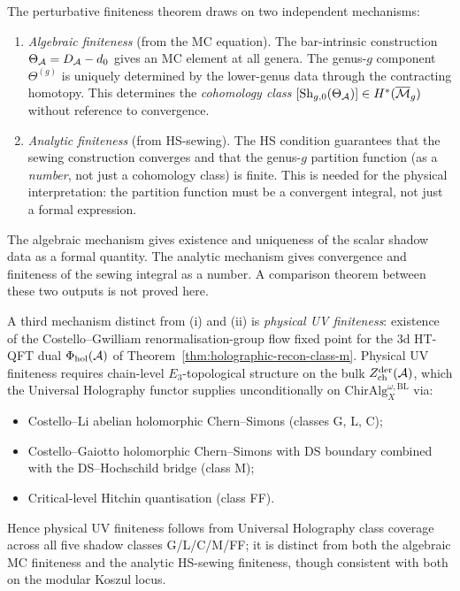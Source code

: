 \begin{remark}
The perturbative finiteness theorem draws on two independent mechanisms:
\begin{enumerate}[label=\textup{(\roman*)}]
\item \emph{Algebraic finiteness} (from the MC equation). The bar-intrinsic construction $\Theta_{\mathcal{A}} = D_{\mathcal{A}} - d_0$ gives an MC element at all genera. The genus-$g$ component $\Theta^{(g)}$ is uniquely determined by the lower-genus data through the contracting homotopy. This determines the \emph{cohomology class} $[\operatorname{Sh}_{g,0}(\Theta_{\mathcal{A}})] \in H^*(\overline{\mathcal{M}}_g)$ without reference to convergence.
\item \emph{Analytic finiteness} (from HS-sewing). The HS condition guarantees that the sewing construction converges and that the genus-$g$ partition function (as a \emph{number}, not just a cohomology class) is finite. This is needed for the physical interpretation: the partition function must be a convergent integral, not just a formal expression.
\end{enumerate}
The algebraic mechanism gives existence and uniqueness of the scalar
shadow data as a formal quantity. The analytic mechanism gives
convergence and finiteness of the sewing integral as a number. A
comparison theorem between these two outputs is not proved here.
\end{remark}

\begin{remark}
\label{rem:thqg-I-three-mechanisms}
A third mechanism distinct from (i) and (ii) is
\emph{physical UV finiteness}: existence of the Costello--Gwilliam
renormalisation-group flow fixed point for the $3$d HT-QFT dual
$\Phi_{\mathrm{hol}}(\mathcal{A})$ of Theorem~\ref{thm:holographic-recon-class-m}.
Physical UV finiteness requires chain-level $E_3$-topological structure
on the bulk $Z^{\mathrm{der}}_{\mathrm{ch}}(\mathcal{A})$, which the
Universal Holography functor supplies unconditionally on
$\mathrm{ChirAlg}^{\omega,\mathrm{BL}}_X$ via:
\begin{itemize}
\item Costello--Li abelian holomorphic Chern--Simons (classes G, L, C);
\item Costello--Gaiotto holomorphic Chern--Simons with DS boundary
combined with the DS--Hochschild bridge (class M);
\item Critical-level Hitchin quantisation (class FF).
\end{itemize}
Hence physical UV finiteness follows from Universal Holography class
coverage across all five shadow classes G/L/C/M/FF; it is distinct
from both the algebraic MC finiteness and the analytic HS-sewing
finiteness, though consistent with both on the modular Koszul locus.
\end{remark}

